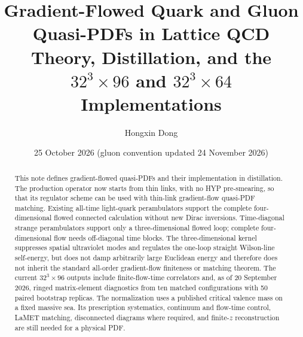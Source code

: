 \documentclass[11pt]{article}
\title{\textbf{Gradient-Flowed Quark and Gluon Quasi-PDFs in Lattice QCD}\\
\large Theory, Distillation, and the \(32^3\times96\) and \(32^3\times64\) Implementations}
\author{Hongxin Dong}
\date{25 October 2026 \quad (gluon convention updated 24 November 2026)}
\numberwithin{equation}{section}
\begin{document}
\maketitle

\begin{abstract}
This note defines gradient-flowed quasi-PDFs and their implementation in
distillation. The production operator now starts from thin links, with no HYP
pre-smearing, so that its regulator scheme can be used with thin-link
gradient-flow quasi-PDF matching. Existing all-time light-quark perambulators
support the complete four-dimensional flowed connected calculation without
new Dirac inversions.
Time-diagonal strange perambulators support only a three-dimensional flowed
loop; complete four-dimensional flow needs off-diagonal time blocks. The
three-dimensional kernel suppresses spatial ultraviolet modes and regulates
the one-loop straight Wilson-line self-energy, but does not damp arbitrarily
large Euclidean energy and therefore does not inherit the standard all-order
gradient-flow finiteness or matching theorem. The
current \(32^3\times96\) outputs include finite-flow-time correlators and,
as of 20 September 2026, ringed matrix-element diagnostics from ten matched
configurations with 50 paired bootstrap replicas. The normalization uses a
published critical valence mass on a fixed massive sea. Its prescription
systematics, continuum and flow-time control, LaMET
matching, disconnected diagrams where required, and finite-\(z\) reconstruction
are still needed for a physical PDF.


\end{abstract}
\end{document}
